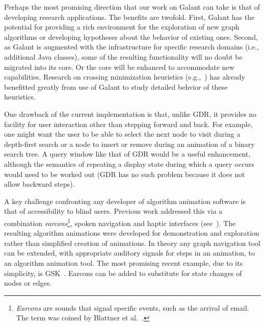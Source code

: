 Perhaps the most promising direction that our work on Galant can take is
that of developing research applications.
The benefits are twofold.
First, Galant has the potential for providing a rich environment for
the exploration of new graph algorithms or developing hypotheses about the
behavior of existing ones.
Second, as Galant is augmented with the infrastructure for specific research
domains (i.e., additional Java classes), some of the resulting functionality
will no doubt be migrated into its core. Or the core will be enhanced to
accommodate new capabilities.
Research on crossing minimization heuristics (e.g.,~\cite{2016-SEA-Stallmann}) has
already benefitted greatly from use of Galant to study detailed behvior of these heuristics.

One drawback of the current implementation is
that, unlike GDR, it provides no facility for user interaction other than stepping forward
and back.
For example, one might want the user to be able to select the next node to
visit during a depth-first search or a node to insert or remove during an animation of
a binary search tree.
A query window like that of GDR would be a useful enhancement, although the semantics of
repeating a display state during which a query occurs would need to be worked out
(GDR has no such problem because it does not allow backward steps).


A key challenge confronting any developer of algorithm animation
software is that of accessibility to blind users.
Previous work addressed this via a combination \emph{earcons}\footnote{
\emph{Earcons} are sounds that signal specific events, such as the arrival of email. The term was coined by Blattner et al.~\cite{1989-HCI-Blattner-earcons}.
}, spoken navigation
and haptic interfaces
(see~\cite{2002-SoftViz-Baloian,2005-SCCC-Baloian,2002-Diagrams-Bennett}).
The resulting algorithm animations were developed for demonstration and exploration rather than simplified
creation of
animations.
In theory any graph navigation tool can be extended, with appropriate auditory
signals for steps in an animation, to an algorithm animation tool.
The most promising recent example, due to its simplicity, is GSK~\cite{2013-SIGCSE-Balik}.
Earcons can be added to substitute for state changes of nodes or edges.


